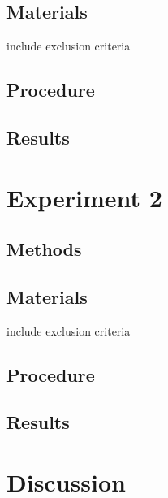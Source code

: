 \documentclass{article} \usepackage{apacite} \usepackage{graphicx} \usepackage{listings}
\begin{document}
\subsection{Materials}

include exclusion criteria

\subsection{Procedure}

\subsection{Results}

\section{Experiment 2}

\subsection{Methods}

\subsection{Materials}

include exclusion criteria

\subsection{Procedure}

\subsection{Results}

\section{Discussion}
\end{document}
